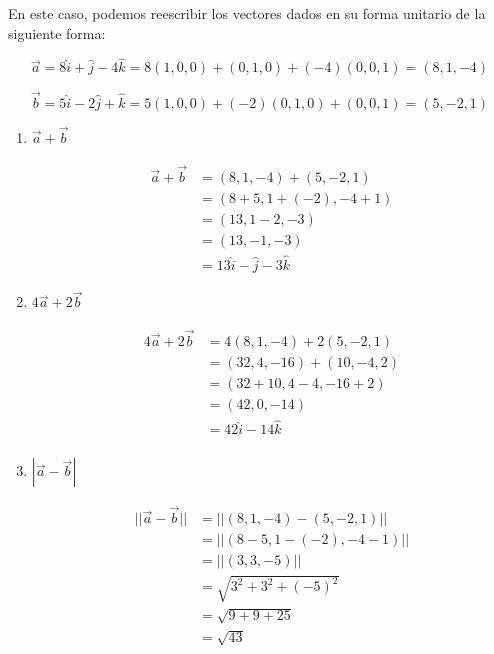 \documentclass[12pt]{article}
\begin{document}
En este caso, podemos reescribir los vectores dados en su forma unitario de la siguiente forma:

\[
\vec{a} = 8\hat{i} + \hat{j} - 4\hat{k} = 8(1, 0, 0) + (0,1,0) + (-4) (0,0,1) = (8, 1, -4)
\]

\[
\vec{b} = 5\hat{i} - 2\hat{j} +\hat{k} = 5(1, 0, 0) + (-2) (0,1,0) + (0,0,1) = (5, -2, 1)
\]

\begin{enumerate}
  
\item $\vec{a} + \vec{b}$
  
  \begin{equation*}
    \begin{split}
      \vec{a} + \vec{b} &= (8, 1, -4) + (5, -2, 1)\\
      &= (8+5,1+ (-2), -4+1) \\
      &=(13, 1-2, -3)\\
      &= (13, -1, -3) \\
      &= 13\hat{i} - \hat{j} -3\hat{k}
    \end{split}
  \end{equation*}
  
\item $4 \vec{a} + 2\vec{b}$
  
  \begin{equation*}
    \begin{split}
      4 \vec{a} + 2\vec{b} &= 4(8, 1, -4) + 2(5, -2, 1)\\
      &=  (32, 4, -16) + (10, -4, 2)\\
      &=  (32+10, 4-4, -16+2) \\
      &= (42, 0, -14)\\
      &= 42\hat{i}  - 14\hat{k} \\
    \end{split}
  \end{equation*}

\item $|\vec{a} - \vec{b}|$
  
  \begin{equation*}
    \begin{split}
      ||\vec{a} - \vec{b}|| &= ||(8, 1, -4) - (5, -2, 1)|| \\
      &= ||(8-5, 1-(-2), -4-1) || \\
      &= ||(3, 3, -5)|| \\
      &= \sqrt{3^2 + 3^2 + (-5)^2} \\
      &= \sqrt{9 + 9 + 25} \\
      &= \sqrt{43} \\
    \end{split}
  \end{equation*}


\end{enumerate}
\end{document}
